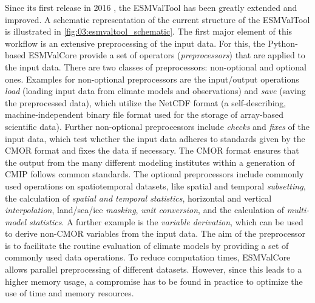 Since its first release in 2016 \autocite{Eyring2016a}, the \ac{ESMValTool} has
been greatly extended and improved. A schematic representation of the current
structure of the \ac{ESMValTool} is illustrated in
\cref{fig:03:esmvaltool_schematic}. The first major element of this workflow is
an extensive preprocessing of the input data. For this, the Python-based
\acf{ESMValCore} provide a set of operators (\emph{preprocessors}) that are
applied to the input data. There are two classes of preprocessors: non-optional
and optional ones. Examples for non-optional preprocessors are the input/output
operations \emph{load} (loading input data from climate models and
observations) and \emph{save} (saving the preprocessed data), which utilize the
\ac{NetCDF} format (a self-describing, machine-independent binary file format
used for the storage of array-based scientific data). Further non-optional
preprocessors include \emph{checks} and \emph{fixes} of the input data, which
test whether the input data adheres to standards given by the \ac{CMOR} format
and fixes the data if necessary. The \ac{CMOR} format ensures that the output
from the many different modeling institutes within a generation of \ac{CMIP}
follows common standards. The optional preprocessors include commonly used
operations on spatiotemporal datasets, like spatial and temporal
\emph{subsetting}, the calculation of \emph{spatial and temporal statistics},
horizontal and vertical \emph{interpolation}, land/sea/ice \emph{masking},
\emph{unit conversion}, and the calculation of \emph{multi-model statistics}. A
further example is the \emph{variable derivation}, which can be used to derive
non-\ac{CMOR} variables from the input data. The aim of the preprocessor is to
facilitate the routine evaluation of climate models by providing a set of
commonly used data operations. To reduce computation times, \ac{ESMValCore}
allows parallel preprocessing of different datasets. However, since this leads
to a higher memory usage, a compromise has to be found in practice to optimize
the use of time and memory resources.

